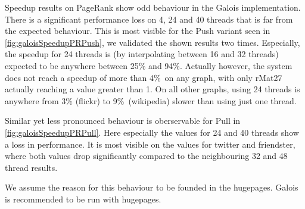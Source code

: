 Speedup results on PageRank show odd behaviour in the Galois implementation.
There is a significant performance loss on 4, 24 and 40 threads that is far from the expected behaviour. This is most visible for the Push variant seen in \autoref{fig:galoisSpeedupPRPush}, we validated the shown results two times.
Especially, the speedup for 24 threads is (by interpolating between 16 and 32 threads) expected to be anywhere between 25\% and 94\%.
Actually however, the system does not reach a speedup of more than 4\%\ on any graph, with only rMat27 actually reaching a value greater than 1.
On all other graphs, using 24 threads is anywhere from 3\% (flickr) to 9\%\ (wikipedia) slower than using just one thread.

Similar yet less pronounced behaviour is oberservable for Pull in \autoref{fig:galoisSpeedupPRPull}.
Here especially the values for 24 and 40 threads show a loss in performance.
It is most visible on the values for twitter and friendster, where both values drop significantly compared to the neighbouring 32 and 48 thread results.

We assume the reason for this behaviour to be founded in the hugepages. Galois is recommended to be run with hugepages. 

